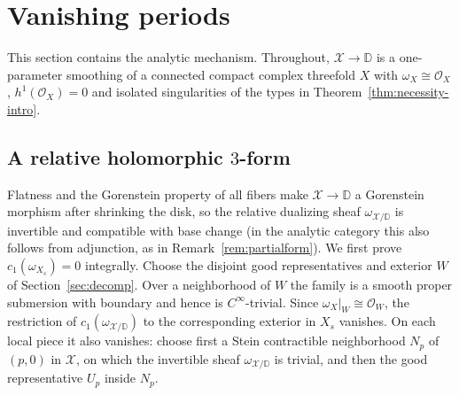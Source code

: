 \documentclass[11pt]{amsart}
\theoremstyle{definition}
\theoremstyle{remark}
\theoremstyle{plain}
\newcommand{\cO}{\mathcal{O}}
\newcommand{\cX}{\mathcal{X}}
\newcommand{\Disk}{\mathbb{D}}
\begin{document}
\section{Vanishing periods}\label{sec:periods}

This section contains the analytic mechanism.  Throughout,
$\cX\to\Disk$ is a one-parameter smoothing of a connected compact complex
threefold $X$ with $\omega_X\cong\cO_X$, $h^1(\cO_X)=0$ and isolated
singularities of the types in Theorem~\ref{thm:necessity-intro}.

\subsection{A relative holomorphic \texorpdfstring{$3$}{3}-form}\label{sec:relform}
Flatness and the Gorenstein property of all fibers make
$\cX\to\Disk$ a Gorenstein morphism after shrinking the disk, so the
relative dualizing sheaf $\omega_{\cX/\Disk}$ is invertible and
compatible with base change \cite{Conrad00} (in the analytic category this
also follows from adjunction, as in Remark~\ref{rem:partialform}).  We first prove
$c_1(\omega_{X_s})=0$ integrally.  Choose the disjoint good
representatives and exterior $W$ of Section~\ref{sec:decomp}.  Over a
neighborhood of $W$ the family is a smooth proper submersion with
boundary and hence is $C^\infty$-trivial.  Since
$\omega_X|_W\cong\cO_W$, the restriction of
$c_1(\omega_{\cX/\Disk})$ to the corresponding exterior in $X_s$
vanishes.  On each local piece it also vanishes: choose first a Stein
contractible neighborhood $N_p$ of $(p,0)$ in $\cX$, on which the
invertible sheaf $\omega_{\cX/\Disk}$ is trivial, and then the good
representative $U_p$ inside $N_p$.
\end{document}
